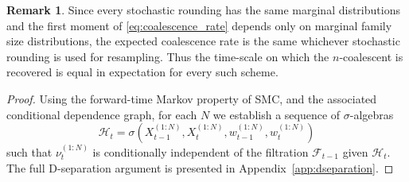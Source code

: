 \documentclass{article}
\theoremstyle{definition}
\newtheorem{remark}{Remark}
\newcommand{\1}[1]{\mathbbm{1}_{\{#1\}}}
\begin{document}
\begin{remark}
Since every stochastic rounding has the same marginal distributions and the first moment of \eqref{eq:coalescence_rate} depends only on marginal family size distributions, the expected coalescence rate is the same whichever stochastic rounding is used for resampling. Thus the time-scale on which the $n$-coalescent is recovered is equal in expectation for every such scheme.
\end{remark}

\begin{proof}
Using the forward-time Markov property of SMC, and the associated conditional dependence graph, for each $N$ we establish a sequence of $\sigma$-algebras
\begin{equation}\label{eq:defn_Ht}
\mathcal{H}_t = \sigma(X_{t-1}^{(1:N)}, X_t^{(1:N)}, w_{t-1}^{(1:N)}, w_t^{(1:N)} )
\end{equation}
such that $\nu_t^{(1:N)}$ is conditionally independent of the filtration $\mathcal{F}_{t-1}$ given $\mathcal{H}_t$. The full D-separation argument is presented in Appendix~\ref{app:dseparation}.


\end{proof}
\end{document}
